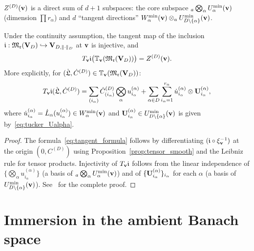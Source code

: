 $Z^{(D)}(\mathbf{v})$ is a direct sum of $d+1$ subspaces: the core subspace
${}_a\bigotimes_\alpha U^{\min}_{\alpha}(\mathbf{v})$ (dimension $\prod r_\alpha$)
and $d$ ``tangent directions'' $W^{\min}_{\alpha}(\mathbf{v}) \otimes_a
U^{\min}_{D\setminus\{\alpha\}}(\mathbf{v})$.

\begin{proposition}
\label{prop:tangent_space}
Under the continuity assumption, the tangent map of the inclusion
$\mathfrak{i}: \mathfrak{M}_{\mathfrak{r}}(\mathbf{V}_D) \hookrightarrow \mathbf{V}_{D,\|\cdot\|_D}$ at $\mathbf{v}$ is
injective, and
\begin{equation*}
    T_{\mathbf{v}} \mathfrak{i}\bigl(\mathbb{T}_{\mathbf{v}}(\mathfrak{M}_{\mathfrak{r}}(\mathbf{V}_D))\bigr)
    = Z^{(D)}(\mathbf{v}).
\end{equation*}
More explicitly, for $(\dot{\mathfrak{L}}, \dot{C}^{(D)}) \in
\mathbb{T}_{\mathbf{v}}(\mathfrak{M}_{\mathfrak{r}}(\mathbf{V}_D))$:
\begin{equation}
\label{eq:tangent_formula}
    T_{\mathbf{v}} \mathfrak{i}(\dot{\mathfrak{L}}, \dot{C}^{(D)})
    = \sum_{(i_\alpha)} \dot{C}^{(D)}_{(i_\alpha)}
      \bigotimes_\alpha u^{(\alpha)}_{i_\alpha}
    + \sum_{\alpha \in D} \sum_{i_\alpha=1}^{r_\alpha}
      \dot{u}^{(\alpha)}_{i_\alpha} \otimes \mathbf{U}^{(\alpha)}_{i_\alpha},
\end{equation}
where $\dot{u}^{(\alpha)}_{i_\alpha} = \dot{L}_\alpha(u^{(\alpha)}_{i_\alpha})
\in W^{\min}_{\alpha}(\mathbf{v})$ and $\mathbf{U}^{(\alpha)}_{i_\alpha} \in
U^{\min}_{D\setminus\{\alpha\}}(\mathbf{v})$ is given by~\eqref{eq:tucker_Ualpha}.
\end{proposition}

\begin{proof}
The formula~\eqref{eq:tangent_formula} follows by differentiating
$(\mathfrak{i} \circ \xi_{\mathbf{v}}^{-1})$ at the origin
$(\mathfrak{0}, C^{(D)})$ using Proposition~\ref{prop:tensor_smooth}
and the Leibniz rule for tensor products. Injectivity of $T_{\mathbf{v}}\mathfrak{i}$
follows from the linear independence of
$\{\bigotimes_\alpha u^{(\alpha)}_{i_\alpha}\}$ (a basis of
${}_a\bigotimes_\alpha U^{\min}_{\alpha}(\mathbf{v})$) and of
$\{\mathbf{U}^{(\alpha)}_{i_\alpha}\}_{i_\alpha}$ for each $\alpha$
(a basis of $U^{\min}_{D\setminus\{\alpha\}}(\mathbf{v})$). See~\cite{FHN2019}
for the complete proof.
\end{proof}

\section{Immersion in the ambient Banach space}
\label{sec:tucker_manifold:immersion}

